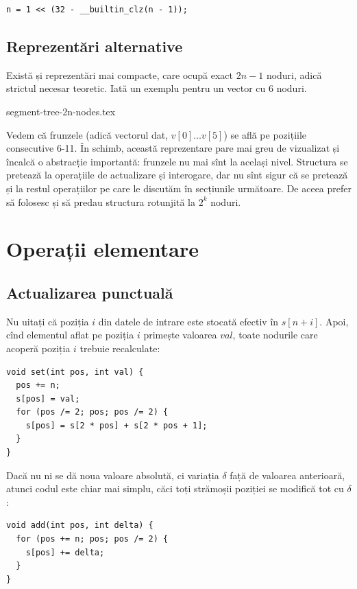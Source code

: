 \begin{verbatim}
n = 1 << (32 - __builtin_clz(n - 1));
\end{verbatim}

\subsection{Reprezentări alternative}

Există și reprezentări mai compacte, care ocupă exact $2n-1$ noduri, adică strictul necesar teoretic. Iată un exemplu pentru un vector cu 6 noduri.

{segment-tree-2n-nodes.tex}

Vedem că frunzele (adică vectorul dat, $v[0] \dots v[5]$) se află pe pozițiile consecutive 6-11. În schimb, această reprezentare pare mai greu de vizualizat și încalcă o abstracție importantă: frunzele nu mai sînt la același nivel. Structura se pretează la operațiile de actualizare și interogare, dar nu sînt sigur că se pretează și la restul operațiilor pe care le discutăm în secțiunile următoare. De aceea prefer să folosesc și să predau structura rotunjită la $2^k$ noduri.

\section{Operații elementare}

\subsection{Actualizarea punctuală}

Nu uitați că poziția $i$ din datele de intrare este stocată efectiv în $s[n + i]$. Apoi, cînd elementul aflat pe poziția $i$ primește valoarea $val$, toate nodurile care acoperă poziția $i$ trebuie recalculate:

\begin{verbatim}
void set(int pos, int val) {
  pos += n;
  s[pos] = val;
  for (pos /= 2; pos; pos /= 2) {
    s[pos] = s[2 * pos] + s[2 * pos + 1];
  }
}
\end{verbatim}

Dacă nu ni se dă noua valoare absolută, ci variația $\delta$ față de valoarea anterioară, atunci codul este chiar mai simplu, căci toți strămoșii poziției se modifică tot cu $\delta$:

\begin{verbatim}
void add(int pos, int delta) {
  for (pos += n; pos; pos /= 2) {
    s[pos] += delta;
  }
}
\end{verbatim}

